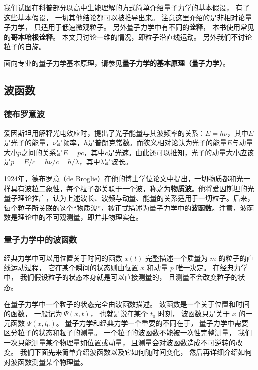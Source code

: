 

我们试图在科普部分以高中生能理解的方式简单介绍量子力学的基本假设， 有了这些基本假设， 一切其他结论都可以被推导出来。 注意这里介绍的是非相对论量子力学， 只适用于低速微观粒子。 另外量子力学中有不同的\textbf{诠释}， 本书使用常见的\textbf{哥本哈根诠释}。 本文只讨论一维的情况，即粒子沿直线运动。 另外我们不讨论粒子的自旋。

面向专业的量子力学基本原理，请参见\textbf{量子力学的基本原理（量子力学）}。%

\subsection{波函数}

\subsubsection{德布罗意波}

爱因斯坦用解释光电效应时，提出了光子能量与其波频率的关系：$E=h\nu$，其中$E$是光子的能量，$\nu$是频率，$h$是普朗克常数。而狭义相对论认为光子的能量$E$与动量大小$p$之间的关系是$E=pc$，其中$c$是光速。由此还可以推知，光子的动量大小应该是$p=E/c=h\nu/c=h/\lambda$，其中$\lambda$是波长。

1924年，德布罗意（de Broglie）在他的博士学位论文中提出，一切物质都和光一样具有波粒二象性，每个粒子都关联于一个波，称之为\textbf{物质波}。他将爱因斯坦的光量子理论推广，认为上述波长、波频与动量、能量的关系适用于一切粒子。后来，每个粒子所关联的这个“物质波”，被正式描述为量子力学中的\textbf{波函数}。注意，波函数是理论中的不可观测量，即并非物理实在。


\subsubsection{量子力学中的波函数}

经典力学中可以用位置关于时间的函数 $x(t)$ 完整描述一个质量为 $m$ 的粒子的直线运动过程， 它在某个瞬间的状态则由位置 $x$ 和动量 $p$ 唯一决定。 在经典力学中， 我们假设粒子的状态本身就是可以直接测量的， 且测量不会改变粒子的状态。

在量子力学中一个粒子的状态完全由波函数描述。 波函数是一个关于位置和时间的函数， 一般记为 $\Psi(x, t)$， 也就是说在某个 $t_0$ 时刻， 波函数只是关于 $x$ 的一元函数 $\Psi(x, t_0)$。 量子力学和经典力学一个重要的不同在于， 量子力学中需要区分粒子的状态和粒子的测量。 一个粒子的波函数不能被一次性完整测量， 我们一次只能测量某个物理量如位置或动量， 且测量会对波函数造成不可逆转的改变。 我们下面先来简单介绍波函数以及它如何随时间变化， 然后再详细介绍如何对波函数测量某个物理量。


